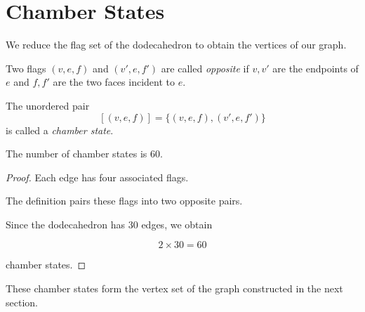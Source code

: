 \section{Chamber States}

We reduce the flag set of the dodecahedron to obtain the vertices of
our graph.

\begin{definition}

Two flags $(v,e,f)$ and $(v',e,f')$ are called \emph{opposite} if
$v,v'$ are the endpoints of $e$ and $f,f'$ are the two faces incident
to $e$.

The unordered pair
\[
[(v,e,f)] = \{(v,e,f),(v',e,f')\}
\]
is called a \emph{chamber state}.

\end{definition}

\begin{proposition}
The number of chamber states is $60$.
\end{proposition}

\begin{proof}

Each edge has four associated flags.

The definition pairs these flags into two opposite pairs.

Since the dodecahedron has $30$ edges, we obtain

\[
2 \times 30 = 60
\]

chamber states.

\end{proof}

These chamber states form the vertex set of the graph constructed in
the next section.

